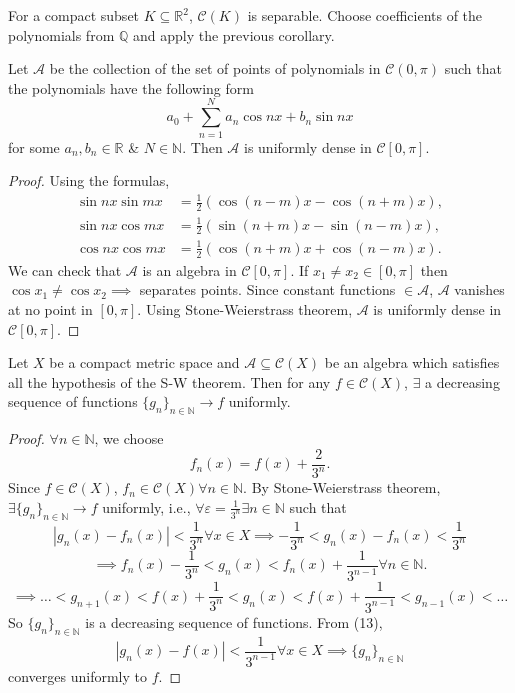 \documentclass{functionspaces}
\begin{document}
\begin{remark}
For a compact subset \( K \subseteq \mathbb{R}^{2} \), \( \mathcal{C}(K) \) is separable. Choose coefficients of the polynomials from \( \mathbb{Q} \) and apply the previous corollary.
\end{remark}

\begin{corollary}
Let \( \mathcal{A} \) be the collection of the set of points of polynomials in \( \mathcal{C}(0,\pi) \) such that the polynomials have the following form
\[
a_{0}+\sum_{n=1}^{N}a_{n}\cos nx+b_{n}\sin nx
\]
for some \( a_{n},b_{n} \in \mathbb{R} \) \& \( N \in \mathbb{N} \). Then \( \mathcal{A} \) is uniformly dense in \( \mathcal{C}[0,\pi] \).
\end{corollary}

\begin{proof}
Using the formulas,
\begin{align*}
\sin nx\sin mx &=\frac{1}{2}(\cos(n-m)x-\cos(n+m)x), \\
\sin nx\cos mx &=\frac{1}{2}(\sin(n+m)x-\sin(n-m)x), \\
\cos nx\cos mx &=\frac{1}{2}(\cos(n+m)x+\cos(n-m)x).
\end{align*}
We can check that \( \mathcal{A} \) is an algebra in \( \mathcal{C}[0,\pi] \). If \( x_{1} \neq x_{2} \in [0,\pi] \) then \( \cos x_{1} \neq \cos x_{2} \implies \) separates points. Since constant functions \( \in \mathcal{A} \), \( \mathcal{A} \) vanishes at no point in \( [0,\pi] \). Using Stone-Weierstrass theorem, \( \mathcal{A} \) is uniformly dense in \( \mathcal{C}[0,\pi] \).
\end{proof}

\begin{theorem}
Let \( X \) be a compact metric space and \( \mathcal{A} \subseteq \mathcal{C}(X) \) be an algebra which satisfies all the hypothesis of the S-W theorem. Then for any \( f \in \mathcal{C}(X) \), \( \exists  \) a decreasing sequence of functions \( \{g_{n}\}_{n\in\mathbb{N}} \to f \) uniformly.
\end{theorem}

\begin{proof}
\( \forall  n \in \mathbb{N} \), we choose
\[
f_{n}(x)=f(x)+\frac{2}{3^{n}}.
\]
Since \( f \in \mathcal{C}(X) \), \( f_{n} \in \mathcal{C}(X)  \forall  n \in \mathbb{N} \). By Stone-Weierstrass theorem, \( \exists  \{g_{n}\}_{n\in\mathbb{N}} \to f \) uniformly, i.e., \( \forall  \varepsilon=\frac{1}{3^{n}}  \exists  n \in \mathbb{N} \) such that
\[
|g_{n}(x)-f_{n}(x)|<\frac{1}{3^{n}}  \forall  x \in X \implies -\frac{1}{3^{n}}<g_{n}(x)-f_{n}(x)<\frac{1}{3^{n}}
\]
\[
\implies f_{n}(x)-\frac{1}{3^{n}}<g_{n}(x)<f_{n}(x)+\frac{1}{3^{n-1}}  \forall  n \in \mathbb{N}. \tag{13}
\]
\[
\implies \ldots <g_{n+1}(x)<f(x)+\frac{1}{3^{n}}<g_{n}(x)<f(x)+\frac{1}{3^{n-1}}<g_{n-1}(x)<\ldots
\]
So \( \{g_{n}\}_{n\in\mathbb{N}} \) is a decreasing sequence of functions. From (13),
\[
|g_{n}(x)-f(x)|<\frac{1}{3^{n-1}}  \forall  x \in X \implies \{g_{n}\}_{n\in\mathbb{N}}
\]
converges uniformly to \( f \).
\end{proof}
\end{document}
